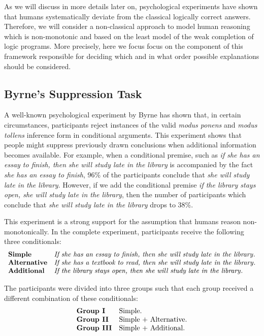 As we will discuss in more details later on, psychological experiments have shown that humans systematically deviate from the classical logically correct answers. Therefore, we will consider a non-classical approach to model human reasoning which is non-monotonic and based on the least model of the weak completion of logic programs. More precisely, here we focus focus on the component of this framework responsible for deciding which and in what order possible explanations should be considered.

\subsection{Byrne's Suppression Task}

A well-known psychological experiment by Byrne \cite{byrne1989suppressing} has shown that, in certain circumstances, participants reject instances of the valid \textit{modus ponens} and \textit{modus tollens} inference form in conditional arguments. This experiment shows that people might suppress previously drawn conclusions when additional information becomes available. For example, when a conditional premise, such as \textit{if she has an essay to finish, then she will study late in the library} is accompanied by the fact \textit{she has an essay to finish}, 96\% of the participants conclude that \textit{she will study late in the library}. However, if we add the conditional premise \textit{if the library stays open, she will study late in the library}, then the number of participants which conclude that \textit{she will study late in the library} drops to 38\%.

This experiment is a strong support for the assumption that humans reason non-monotonically. In the complete experiment, participants receive the following three conditionals:
\[
\begin{array}{ll}
\mbox{\textbf{Simple}} & \mbox{\textit{If she has an essay to finish, then she will study late in the library}}.\\
\mbox{\textbf{Alternative}} & \mbox{\textit{If she has a textbook to read, then she will study late in the library}}.\\
\mbox{\textbf{Additional}} & \mbox{\textit{If the library stays open, then she will study late in the library}}.
\end{array}
\]

The participants were divided into three groups such that each group received a different combination of these conditionals:
\[
\begin{array}{ll}
\mbox{\textbf{Group I}} & \mbox{Simple}.\\
\mbox{\textbf{Group II}} & \mbox{Simple + Alternative}.\\
\mbox{\textbf{Group III}} & \mbox{Simple + Additional}.
\end{array}
\]


